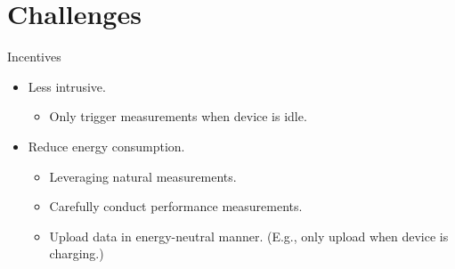 \section{Challenges}

\begin{frame}{Incentives}
  \begin{itemize}
    \item Less intrusive.
      \begin{itemize}
        \item Only trigger measurements when device is idle.
      \end{itemize}
    \item Reduce energy consumption.
      \begin{itemize}
        \item Leveraging natural measurements.
        \item Carefully conduct performance measurements.
        \item Upload data in energy-neutral manner. (E.g., only upload when device
          is charging.)
      \end{itemize}
  \end{itemize}
\end{frame}

